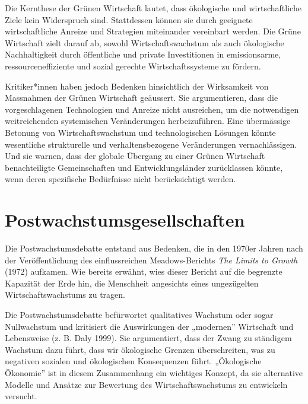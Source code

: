 \documentclass[
  nswissgerman,
  a4paper,
  openany]{book}
\begin{document}
Die Kernthese der Grünen Wirtschaft lautet, dass ökologische und
wirtschaftliche Ziele kein Widerspruch sind. Stattdessen können sie
durch geeignete wirtschaftliche Anreize und Strategien miteinander
vereinbart werden. Die Grüne Wirtschaft zielt darauf ab, sowohl
Wirtschaftswachstum als auch ökologische Nachhaltigkeit durch
öffentliche und private Investitionen in emissionsarme,
ressourceneffiziente und sozial gerechte Wirtschaftssysteme zu fördern.

Kritiker*innen haben jedoch Bedenken hinsichtlich der Wirksamkeit von
Massnahmen der Grünen Wirtschaft geäussert. Sie argumentieren, dass die
vorgeschlagenen Technologien und Anreize nicht ausreichen, um die
notwendigen weitreichenden systemischen Veränderungen herbeizuführen.
Eine übermässige Betonung von Wirtschaftswachstum und technologischen
Lösungen könnte wesentliche strukturelle und verhaltensbezogene
Veränderungen vernachlässigen. Und sie warnen, dass der globale Übergang
zu einer Grünen Wirtschaft benachteiligte Gemeinschaften und
Entwicklungsländer zurücklassen könnte, wenn deren spezifische
Bedürfnisse nicht berücksichtigt werden.

\section{Postwachstumsgesellschaften}\label{postwachstumsgesellschaften}

Die Postwachstumsdebatte entstand aus Bedenken, die in den 1970er Jahren
nach der Veröffentlichung des einflussreichen Meadows-Berichts \emph{The
Limits to Growth} (1972) aufkamen. Wie bereits erwähnt, wies dieser
Bericht auf die begrenzte Kapazität der Erde hin, die Menschheit
angesichts eines ungezügelten Wirtschaftswachstums zu tragen.

Die Postwachstumsdebatte befürwortet qualitatives Wachstum oder sogar
Nullwachstum und kritisiert die Auswirkungen der „modernen'' Wirtschaft
und Lebensweise (z. B. Daly 1999). Sie argumentiert, dass der Zwang zu
ständigem Wachstum dazu führt, dass wir ökologische Grenzen
überschreiten, was zu negativen sozialen und ökologischen Konsequenzen
führt. „Ökologische Ökonomie'' ist in diesem Zusammenhang ein wichtiges
Konzept, da sie alternative Modelle und Ansätze zur Bewertung des
Wirtschaftswachstums zu entwickeln versucht.
\end{document}
